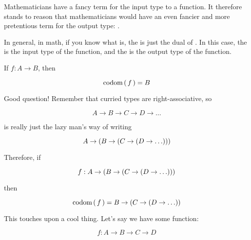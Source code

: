 \begin{definition}[Codomain]
    Mathematicians have a fancy term for the input type to a function. It
    therefore stands to reason that mathematicians would have an even fancier
    and more pretentious term for the output type: .

    In general, in math, if you know what  is, the
     is just the dual of . In this case, the
     is the input type of the function, and the  is
    the output type of the function.

    If $f : A \to B$, then 

    \begin{equation}
        \text{codom} \left(\, f \,\right) = B
    \end{equation}


    Good question! Remember that curried types are right-associative, so

    \begin{equation}
        A \to B \to C \to D \to \dots
    \end{equation}

    is really just the lazy man's way of writing

    \begin{equation}
        A \to \parens{B \to \parens{C \to \parens{D \to \dots}}}
    \end{equation}

    Therefore, if 

    \begin{equation}
        f : A \to \parens{B \to \parens{C \to \parens{D \to \dots}}}
    \end{equation}

    then

    \begin{equation}
        \codom{f} = B \to \parens{C \to \parens{D \to \dots}}
    \end{equation}
\end{definition}


This touches upon a cool thing. Let's say we have some function:

\begin{equation}
    f : A \to B \to C \to D
\end{equation}

